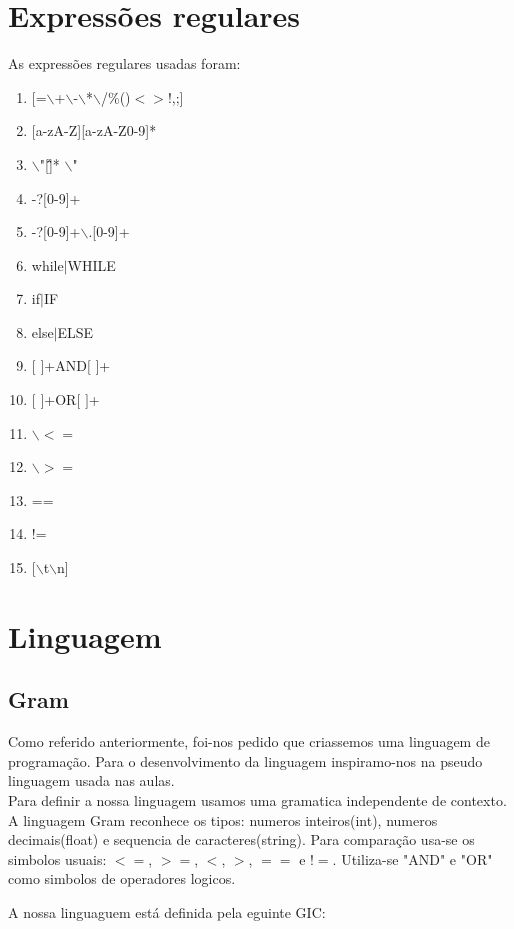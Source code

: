 \documentclass{report}
\begin{document}
\section{Expressões regulares} 
As expressões regulares usadas foram:

\begin{enumerate}
	\item $[$=$\backslash$+$\backslash$-$\backslash$*$\backslash$/\%()$<>$!,;]
	\item $[$a-zA-Z][a-zA-Z0-9]*
	\item $\backslash$"[\^\"]* $\backslash$"
	\item -?$[$0-9]+
	\item -?$[$0-9]+$\backslash$.[0-9]+ 
	\item while$|$WHILE
	\item if$|$IF 
	\item else$|$ELSE
	\item $[$ $]$+AND$[$ $]$+
	\item $[$ $]$+OR$[$ $]$+
	\item $\backslash$$<=$
	\item $\backslash$$>=$
	\item ==
	\item != 
	\item $[$$\backslash$t$\backslash$n]

\end{enumerate}

\section{Linguagem}
\subsection{Gram}
\indent
Como referido anteriormente, foi-nos pedido que criassemos uma linguagem de programação. Para o desenvolvimento da linguagem inspiramo-nos na pseudo linguagem usada nas aulas.\\
\indent
Para definir a nossa linguagem usamos uma gramatica independente de contexto.\\
\indent
A linguagem Gram reconhece os tipos: numeros inteiros(int), numeros decimais(float) e sequencia de caracteres(string).
Para comparação usa-se os simbolos usuais: $<=$, $>=$, $<$, $>$, $==$ e $!=$. Utiliza-se "AND" e "OR" como simbolos de operadores logicos.

\indent
A nossa linguaguem está definida pela eguinte GIC:
\end{document}
